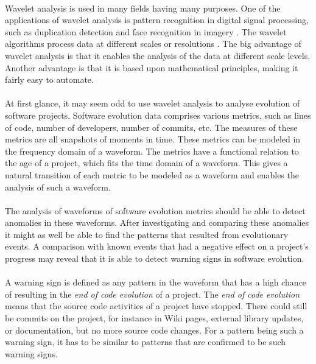 \paragraph{}
Wavelet analysis is used in many fields having many purposes. One of the
applications of wavelet analysis is pattern recognition in digital signal
processing, such as duplication detection and face recognition in imagery
\cite{myna, wadkar}. The wavelet algorithms process data at different scales or
resolutions \cite{graps}. The big advantage of wavelet analysis is that
it enables the analysis of the data at different scale levels. Another
advantage is that it is based upon mathematical principles, making it fairly
easy to automate.

\paragraph{}
At first glance, it may seem odd to use wavelet analysis to analyse evolution of
software projects. Software evolution data comprises various metrics, such as
lines of code, number of developers, number of commits, etc. The measures of
these metrics are all snapshots of moments in time. These metrics can be
modeled in the frequency domain of a waveform. The metrics have a functional
relation to the age of a project, which fits the time domain of a waveform.
This gives a natural transition of each metric to be modeled as a waveform and
enables the analysis of such a waveform.

\paragraph{}
The analysis of waveforms of software evolution metrics should be able to
detect anomalies in these waveforms. After investigating and comparing these
anomalies it might as well be able to find the patterns that resulted from
evolutionary events. A comparison with known events that had a negative effect
on a project's progress may reveal that it is able to detect warning signs in
software evolution.

\paragraph{}
A warning sign is defined as any pattern in the waveform that has a high chance
of resulting in the \textit{end of code evolution} of a project. The
\textit{end of code evolution} means that the source code activities of a
project have stopped. There could still be commits on the project, for instance
in Wiki pages, external library updates, or documentation, but no more source
code changes. For a pattern being such a warning sign, it has to be similar to
patterns that are confirmed to be such warning signs.\\[1ex]

